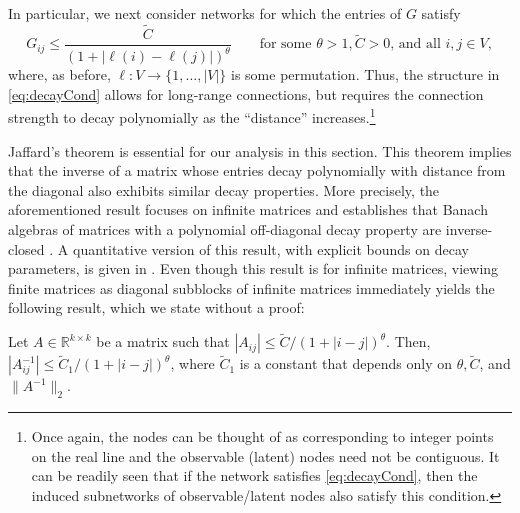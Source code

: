 \documentclass[opre,nonblindrev]{informs3} %
\begin{document}
In particular,
we next consider networks
for which the
entries of $G$
satisfy
\begin{equation} \label{eq:decayCond}
G_{ij}\leq \frac{ \tilde C}{(1+|\ell(i)-\ell(j)|)^{\theta}} \qquad \mbox{for some $\theta>1, \tilde C>0$, and all $i,j\in V$},
\end{equation}
where, as before, $\ell:V\rightarrow \{1,\dots,|V|\}$ is some permutation.
Thus, the structure in
\eqref{eq:decayCond}
allows for long-range connections, but requires the connection strength to decay polynomially as the ``distance'' increases.\footnote{Once again, the nodes can be thought of as corresponding to integer points on the real line  and the observable (latent) nodes need not be  contiguous. It can be readily seen that if the network satisfies \eqref{eq:decayCond}, then the induced subnetworks of observable/latent nodes also satisfy this condition.}

Jaffard's theorem \citep{jaffard1990proprietes}
is essential for our analysis in this section.
This theorem implies that the inverse of  a matrix whose entries decay polynomially
with distance from the diagonal
also exhibits similar decay properties.
More precisely,
the aforementioned result
focuses on infinite matrices and establishes that
Banach algebras  of matrices with a polynomial off-diagonal decay property are inverse-closed \citep{grochenig2010noncommutative,grochenig2014norm}.
A quantitative version of this result, with explicit bounds on decay parameters, is given in \citet{grochenig2014norm}.
Even though this result is for infinite matrices, viewing finite matrices as diagonal subblocks of infinite matrices immediately yields the following result, which we state without a proof:
\begin{lemma}\label{lem:jaffardDecayOrig}
	Let $A \in \mathbb{R}^{k\times k}$ be a matrix such that
	$|A_{ij}|\leq \tilde C/(1+ |i-j|)^\theta$.
	Then, $|A^{-1}_{ij}|\leq  \tilde C_1/(1+ |i-j|)^\theta$, where
	$\tilde C_1$ is a constant
	that depends only on $\theta, \tilde C$, and $\|A^{-1} \|_2$.
\end{lemma}
\end{document}

